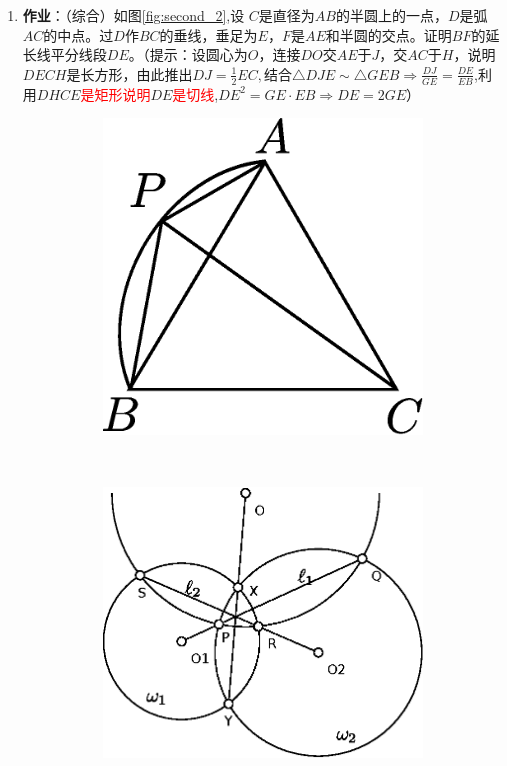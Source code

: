 \documentclass[12pt]{article}
\begin{document}
\begin{enumerate}
\begin{enumerate}[label=(\alph*)]
\item \textbf{作业}：（综合）如图\ref{fig:second_2},设 $C$是直径为$AB$的半圆上的一点，$D$是弧$AC$的中点。过$D$作$BC$的垂线，垂足为$E$，$F$是$AE$和半圆的交点。证明$BF$的延长线平分线段$DE$。（提示：设圆心为$O$，连接$DO$交$AE$于$J$，交$AC$于$H$，说明$DECH$是长方形，由此推出$DJ=\frac{1}{2}EC,结合\triangle DJE\sim \triangle GEB \Rightarrow \frac{DJ}{GE}=\frac{DE}{EB}$,利用$DHCE$\textcolor{red}{是矩形说明}$DE$\textcolor{red}{是切线},$DE^2=GE\cdot EB \Rightarrow DE=2GE$）

    \begin{figure}[!ht]
    \centering
    \begin{subfigure}[b]{0.45\textwidth}
    \includegraphics[width=\textwidth]{second_3.eps}
    \caption{}\label{fig:second_3}
    \end{subfigure}~
    \begin{subfigure}[b]{0.45\textwidth}
    \includegraphics[width=\textwidth]{second_4.eps}

\end{subfigure}
\end{figure}
\end{enumerate}
\end{enumerate}
\end{document}
